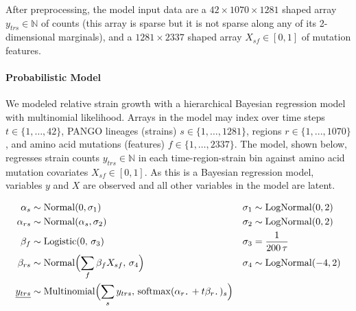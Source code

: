 \documentclass[12pt]{article}
\newcommand \blank {{\,\pmb\cdot\,}}
\begin{document}
After preprocessing, the model input data are a $42 \times 1070 \times 1281$ shaped array $y_{trs}\in\mathbb N$ of counts (this array is sparse but it is not sparse along any of its 2-dimensional marginals), and a $1281 \times 2337$ shaped array $X_{sf}\in[0,1]$ of mutation features.

\paragraph*{Probabilistic Model}

% 

We modeled relative strain growth with a hierarchical Bayesian regression model with multinomial likelihood.
Arrays in the model may index over time steps $t\in \{1,\dots,42\}$, PANGO lineages (strains) $s\in\{1,\dots,1281\}$, regions $r\in\{1,...,1070\}$, and amino acid mutations (features) $f\in\{1,\dots,2337\}$.
The model, shown below, regresses strain counts $y_{trs}\in\mathbb N$ in each time-region-strain bin against amino acid mutation covariates $X_{sf} \in [0,1]$.
As this is a Bayesian regression model, variables $y$ and $X$ are observed and all other variables in the model are latent.

\begin{align*}
  \textstyle
  \alpha_s &\sim \operatorname{Normal}(0, \sigma_1) &
  \sigma_1 &\sim \operatorname{LogNormal}(0, 2) \\
  \alpha_{rs} &\sim \operatorname{Normal}(\alpha_s, \sigma_2) &
  \sigma_2 &\sim \operatorname{LogNormal}(0, 2) \\
  \beta_f &\sim \operatorname{Logistic}(0,\, \sigma_3) &
  \sigma_3 &= \frac{1}{200\, \tau} \\
  \beta_{rs} &\sim \operatorname{Normal}\Bigl(
   \sum_f \beta_f X_{sf},\, \sigma_4
  \Bigr) &
  \sigma_4 &\sim \operatorname{LogNormal}(-4, 2) \\
  \underline{y_{trs}} &\sim \operatorname{Multinomial}\Bigl(
    \sum_s y_{trs},\, \operatorname{softmax}(\alpha_{r\blank} + t \beta_{r\blank})_s
  \Bigr)
\end{align*}
\end{document}
